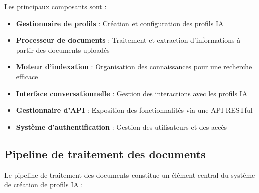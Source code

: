 Les principaux composants sont :

\begin{itemize}
  \item \textbf{Gestionnaire de profils} : Création et configuration des profils IA
  
  \item \textbf{Processeur de documents} : Traitement et extraction d'informations à partir des documents uploadés
  
  \item \textbf{Moteur d'indexation} : Organisation des connaissances pour une recherche efficace
  
  \item \textbf{Interface conversationnelle} : Gestion des interactions avec les profils IA
  
  \item \textbf{Gestionnaire d'API} : Exposition des fonctionnalités via une API RESTful
  
  \item \textbf{Système d'authentification} : Gestion des utilisateurs et des accès
\end{itemize}

\subsection{Pipeline de traitement des documents}

Le pipeline de traitement des documents constitue un élément central du système de création de profils IA :

